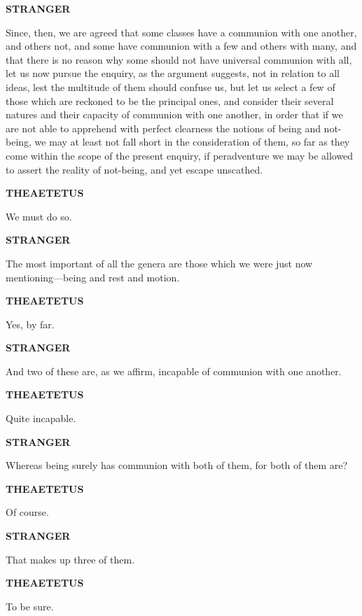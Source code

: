 \documentclass[11pt,letter]{article}
\begin{document}
\par \textbf{STRANGER}
\par   Since, then, we are agreed that some classes have a communion with one another, and others not, and some have communion with a few and others with many, and that there is no reason why some should not have universal communion with all, let us now pursue the enquiry, as the argument suggests, not in relation to all ideas, lest the multitude of them should confuse us, but let us select a few of those which are reckoned to be the principal ones, and consider their several natures and their capacity of communion with one another, in order that if we are not able to apprehend with perfect clearness the notions of being and not-being, we may at least not fall short in the consideration of them, so far as they come within the scope of the present enquiry, if peradventure we may be allowed to assert the reality of not-being, and yet escape unscathed.

\par \textbf{THEAETETUS}
\par   We must do so.

\par \textbf{STRANGER}
\par   The most important of all the genera are those which we were just now mentioning—being and rest and motion.

\par \textbf{THEAETETUS}
\par   Yes, by far.

\par \textbf{STRANGER}
\par   And two of these are, as we affirm, incapable of communion with one another.

\par \textbf{THEAETETUS}
\par   Quite incapable.

\par \textbf{STRANGER}
\par   Whereas being surely has communion with both of them, for both of them are?

\par \textbf{THEAETETUS}
\par   Of course.

\par \textbf{STRANGER}
\par   That makes up three of them.

\par \textbf{THEAETETUS}
\par   To be sure.
\end{document}
